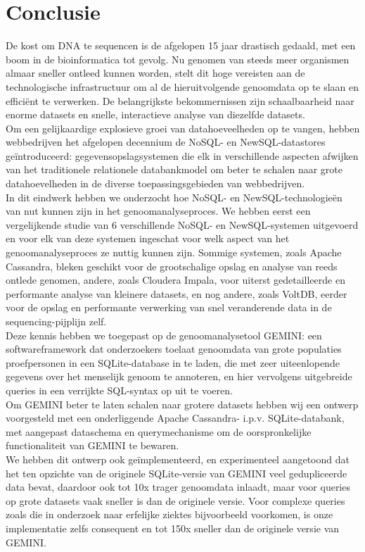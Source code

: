 \chapter{Conclusie}

De kost om DNA te sequencen is de afgelopen 15 jaar drastisch gedaald, met een boom in de bioinformatica tot gevolg. Nu genomen van steeds meer organismen almaar sneller ontleed kunnen worden, stelt dit hoge vereisten aan de technologische infrastructuur om al de hieruitvolgende genoomdata op te slaan en effici\"ent te verwerken. De belangrijkste bekommernissen zijn schaalbaarheid naar enorme datasets en snelle, interactieve analyse van diezelfde datasets.\\
Om een gelijkaardige explosieve groei van datahoeveelheden op te vangen, hebben webbedrijven het afgelopen decennium de NoSQL- en NewSQL-datastores ge\"introduceerd: gegevensopslagsystemen die elk in verschillende aspecten afwijken van het traditionele relationele databankmodel om beter te schalen naar grote datahoevelheden in de diverse toepassingsgebieden van webbedrijven.\\
In dit eindwerk hebben we onderzocht hoe NoSQL- en NewSQL-technologie\"en van nut kunnen zijn in het genoomanalyseproces. We hebben eerst een vergelijkende studie van 6 verschillende NoSQL- en NewSQL-systemen uitgevoerd en voor elk van deze systemen ingeschat voor welk aspect van het genoomanalyseproces ze nuttig kunnen zijn. Sommige systemen, zoals Apache Cassandra, bleken geschikt voor de grootschalige opslag en analyse van reeds ontlede genomen, andere, zoals Cloudera Impala, voor uiterst gedetailleerde en performante analyse van kleinere datasets, en nog andere, zoals VoltDB, eerder voor de opslag en performante verwerking van snel veranderende data in de sequencing-pijplijn zelf.\\
Deze kennis hebben we toegepast op de genoomanalysetool GEMINI: een softwareframework dat onderzoekers toelaat genoomdata van grote populaties proefpersonen in een SQLite-database in te laden, die met zeer uiteenlopende gegevens over het menselijk genoom te annoteren, en hier vervolgens uitgebreide queries in een verrijkte SQL-syntax op uit te voeren.\\
Om GEMINI beter te laten schalen naar grotere datasets hebben wij een ontwerp voorgesteld met een onderliggende Apache Cassandra- i.p.v. SQLite-databank, met aangepast dataschema en querymechanisme om de oorspronkelijke functionaliteit van GEMINI te bewaren.\\
We hebben dit ontwerp ook ge\"implementeerd, en experimenteel aangetoond dat het ten opzichte van de originele SQLite-versie van GEMINI veel gedupliceerde data bevat, daardoor ook tot 10x trager genoomdata inlaadt, maar voor queries op grote datasets vaak sneller is dan de originele versie. Voor complexe queries zoals die in onderzoek naar erfelijke ziektes bijvoorbeeld voorkomen, is onze implementatie zelfs consequent en tot 150x sneller dan de originele versie van GEMINI.